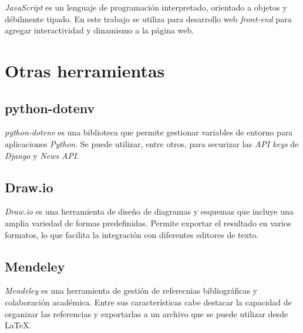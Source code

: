 \emph{JavaScript} \citep{wiki:javascript} es un lenguaje de programación interpretado, orientado a objetos y débilmente tipado. En este trabajo se utiliza para desarrollo web \emph{front-end} para agregar 
interactividad y dinamismo a la página web. 


\section{Otras herramientas}\label{otras_herramientas}

\subsection{python-dotenv}\label{python-dotenv}

\emph{python-dotenv} \citep{online:dotenv} es una biblioteca que permite gestionar variables de entorno para aplicaciones \emph{Python}. Se puede utilizar, entre otros, para securizar las \emph{API keys} de \emph{Django} y \emph{News API}. 

\subsection{Draw.io}\label{draw_io}

\emph{Draw.io} \citep{online:drawio} es una herramienta de diseño de diagramas y esquemas que incluye una amplia variedad de formas predefinidas. Permite exportar el resultado en varios formatos, lo que facilita la integración con diferentes editores de texto. 

\subsection{Mendeley}\label{mendeley}

\emph{Mendeley} \citep{online:mendeley} es una herramienta de gestión de referecnias bibliográficas y colaboración académica. Entre sus características cabe destacar la capacidad de organizar las referencias y exportarlas a un archivo que se puede utilizar desde \LaTeX. 
